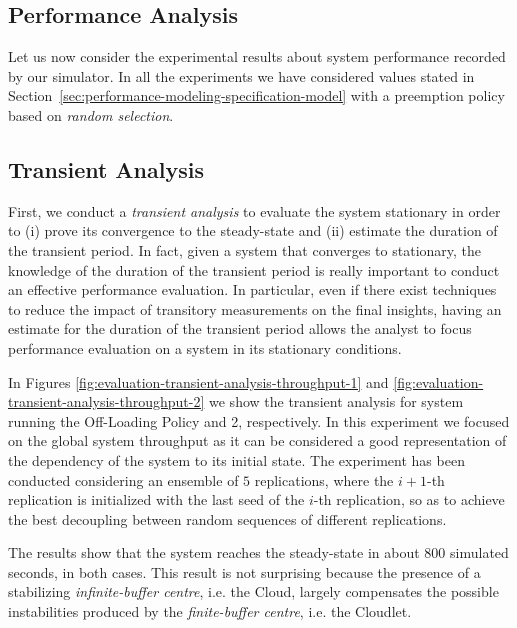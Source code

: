 \subsection{Performance Analysis}
\label{sec:evaluation-performance-analysis}
Let us now consider the experimental results about system performance recorded by our simulator.
In all the experiments we have considered values stated in Section~\ref{sec:performance-modeling-specification-model} with a preemption policy based on \textit{random selection}.

\subsection{Transient Analysis}
\label{sec:evaluation-transient-analysis}
First, we conduct a \textit{transient analysis} to evaluate the system stationary in order to (i) prove its convergence to the steady-state and (ii) estimate the duration of the transient period.
%
In fact, given a system that converges to stationary, the knowledge of the duration of the transient period is really important to conduct an effective performance evaluation. 
%
In particular, even if there exist techniques to reduce the impact of transitory measurements on the final insights, having an estimate for the duration of the transient period allows the analyst to focus performance evaluation on a system in its stationary conditions.

In Figures \ref{fig:evaluation-transient-analysis-throughput-1} and \ref{fig:evaluation-transient-analysis-throughput-2} we show the transient analysis for system running the Off-Loading Policy and 2, respectively. 
In this experiment we focused on the global system throughput as it can be considered a good representation of the dependency of the system to its initial state.
The experiment has been conducted considering an ensemble of $5$ replications, where the $i+1$-th replication is initialized with the last seed of the $i$-th replication, so as to achieve the best decoupling between random sequences of different replications.

The results show that the system reaches the steady-state in about $800$ simulated seconds, in both cases.
This result is not surprising because the presence of a stabilizing \textit{infinite-buffer centre}, i.e. the Cloud, largely compensates the possible instabilities produced by the \textit{finite-buffer centre}, i.e. the Cloudlet.

